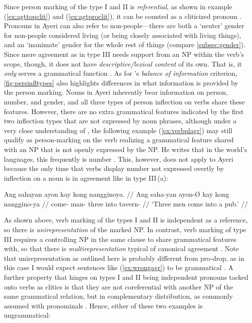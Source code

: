 Since person marking of the type I and II is \emph{referential}, as shown 
in example (\ref{ex:agttopclit}) and (\ref{ex:agtproclit}), it can be counted as 
a cliticized pronoun \citep[103]{corbett2006}. Pronouns in Ayeri can also refer 
to non-people---there are both a `neuter' gender for non-people considered 
living (or being closely associated with living things), and an `inanimate' 
gender for the whole rest of things (compare \autoref{subsec:gender}). Since 
mere agreement as in type III needs support from an NP within the verb's scope, 
though, it does not have \emph{descriptive/lexical content} of its own. That 
is, it \emph{only} serves a grammatical function \citep[104]{corbett2006}. As 
for \citeauthor{corbett2006}'s \emph{balance of information} criterion, 
\autoref{fig:persinfltypes} also highlights differences in what information is 
provided by the person marking. Nouns in Ayeri inherently bear information on 
person, number, and gender, and all three types of person inflection on verbs 
share these features. However, there are no extra grammatical features indicated 
by the first two inflection types that are not expressed by noun phrases, 
although under a very close understanding of \citeauthor{corbett2006}, the 
following example (\ref{ex:verbplagr}) may still qualify as person-marking on 
the verb realizing a grammatical feature shared with an NP that is not openly 
expressed by the NP. He writes that in the world's languages, this frequently is 
number \citep[105]{corbett2006}. This, however, does not apply to Ayeri because 
the only time that verbs display number not expressed overtly by inflection on a 
noun is in agreement like in type III\,(a):

\ex\label{ex:verbplagr} %
\begingl
	\gla Ang sahayan ayon kay kong nangginoya. //
	\glb Ang saha-yan ayon-Ø kay kong nanggino-ya //
	\glc \AgtT{} come-\TplM{} man-\Top{} three into tavern-\Loc{} //
	\glft `Three men come into a pub.' //
\endgl\xe

As shown above, verb marking of the types I and II is independent as a 
reference, so there is \emph{unirepresentation} of the marked NP. In contrast, 
verb marking of type III requires a controlling NP in the same clause to share 
grammatical features with, so that there is \emph{multirepresentation} typical 
of canonical agreement \citep[106]{corbett2006}. Note that unirepresentation as 
outlined here is probably different from pro-drop, as in this case I would 
expect sentences like (\ref{ex:wrongagr}) to be grammatical 
\citep[107]{corbett2006}. A further property that hinges on types I and II being 
independent pronouns tacked onto verbs as clitics is that they are not 
coreferential with another NP of the same grammatical relation, but in 
complementary distribution, as commonly assumed with pronominals 
\citep[108]{corbett2006}. Hence, either of these two examples is ungrammatical:

